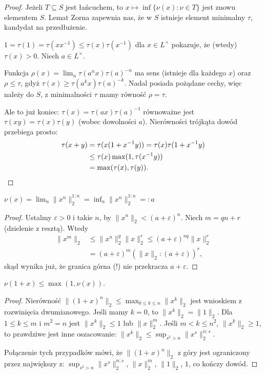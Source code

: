 \begin{proof}
	Jeżeli $T \subseteq S$ jest łańcuchem, to $x \mapsto \inf \{\nu(x) : \nu \in T\}$ jest znowu elementem $S$.
	Lemat Zorna zapewnia nas, że w $S$ istnieje element minimalny $\tau$, kandydat na przedłużenie.

	$1 = \tau(1) = \tau(xx^{-1}) \le \tau(x) \tau(x^{-1})$ dla $x \in L^\times$ pokazuje, że (wtedy) $\tau (x) > 0$.
	Niech $a \in L^\times$.
	
	Funkcja $\rho(x) = \lim_n \tau(a^nx)\tau(a)^{-n}$ ma sens (istnieje dla każdego $x$) oraz $\rho \le \tau$, gdyż $\tau(x) \ge \tau(a^kx)\tau(a)^{-k}$.
	Nadal posiada pożądane cechy, więc należy do $S$, z minimalności $\tau$ mamy równość $\rho = \tau$.
	
	Ale to już koniec: $\tau(x) = \tau(ax) \tau(a)^{-1}$ równoważne jest $\tau(xy) = \tau(x) \tau(y)$ (wobec dowolności $a$).
	Nierówności trójkąta dowód przebiega prosto:
	\begin{align*}
		\tau(x + y) & = \tau(x(1 + x^{-1}y)) = \tau(x) \tau(1 + x^{-1}y) \\
		& \le \tau(x) \max (1, \tau(x^{-1}y)) \\
		& = \max(\tau(x), \tau(y)). \qedhere
	\end{align*}
\end{proof}

\begin{lemat}
	$\nu(x) = \lim_n \|x^n\|_2^{1:n} = \inf_n \|x^n\|_2^{1:n} =: a$
\end{lemat}

\begin{proof}
	Ustalmy $\varepsilon > 0$ i takie $n$, by $\|x^n\|_2 < (a + \varepsilon)^n$.
	Niech $m = qn + r$ (dzielenie z resztą).
	Wtedy
	\begin{align*}
		\|x^m\|_2 & \le \|x^n\|_2^q \|x\|_2^r \le (a + \varepsilon)^{nq} \|x\|_2^r \\
		& = (a + \varepsilon)^m (\|x\|_2 : (a + \varepsilon))^r,
	\end{align*}
	skąd wynika już, że granica górna (!) nie przekracza $a + \varepsilon$.
\end{proof}

\begin{lemat}
	$\nu(1 + x) \le \max(1, \nu(x))$.
\end{lemat}

\begin{proof}
Nierówność $\|(1 + x)^n\|_2 \le \max_{0 \le k \le n} \|x^k\|_2$ jest wnioskiem z rozwinięcia dwumianowego.
Jeśli mamy $k = 0$, to $\|x^k\|_2 = \|1\|_2$.
Dla $1 \le k \le m$ i $m^2 = n$ jest $\|x^k\|_2 \le 1$ lub  $\|x\|_2^m$.
Jeśli $m < k \le n^2$, $\|x^k\|_2 \ge 1$, to prawdziwe jest inne oszacowanie: $\|x^k\|_2 \le \sup_{s^2 > n} \|x^s\|_2^{n:s}$.

Połączenie tych przypadków mówi, że $\|(1+x)^n\|_2$ z góry jest ograniczony przez największy z: $\sup_{s^2 > n} \|x^s\|_2^{n:s}$, $\|x\|_2^m$, $\|1\|_2$, $1$, co kończy dowód.
\end{proof}

